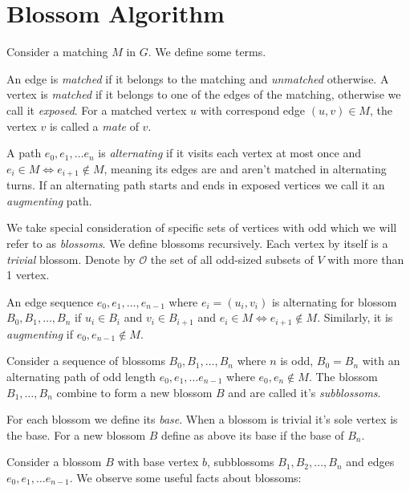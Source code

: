 \section{Blossom Algorithm}

Consider a matching $M$ in $G$. We define some terms.

An edge is \textit{matched} if it belongs to the matching and \textit{unmatched} otherwise. 
A vertex is \textit{matched} if it belongs to one of the edges of the matching, otherwise we call it \textit{exposed}. 
For a matched vertex $u$ with correspond edge $(u, v) \in M$, the vertex $v$ is called a \textit{mate} of $v$.

A path $e_0, e_1, \dots e_n$ is \textit{alternating} if it visits each vertex at most once and $e_i \in M \Leftrightarrow e_{i+1} \notin M$, meaning its edges are and aren't matched in alternating turns. 
If an alternating path starts and ends in exposed vertices we call it an \textit{augmenting} path.

We take special consideration of specific sets of vertices with odd which we will refer to as \textit{blossoms}. We define blossoms recursively. Each vertex by itself is a \textit{trivial} blossom. Denote by $\mathcal{O}$ the set of all odd-sized subsets of $V$ with more than 1 vertex.

An edge sequence $e_0, e_1, \dots, e_{n-1}$ where $e_i=(u_i, v_i)$ is alternating for blossom $B_0, B_1, \dots, B_n$ if $u_i \in B_i$ and $v_i \in B_{i+1}$ and $e_i \in M \Leftrightarrow e_{i+1} \notin M$. Similarly, it is \textit{augmenting} if $e_0, e_{n-1} \notin M$.

Consider a sequence of blossoms $B_0, B_1, \dots, B_n$ where $n$ is odd, $B_0 = B_n$ with an alternating path of odd length $e_0, e_1, \dots e_{n-1}$ where $e_0, e_n \notin M$. The blossom $B_1, \dots, B_n$ combine to form a new blossom $B$ and are called it's \textit{subblossoms}.

For each blossom we define its \textit{base}. When a blossom is trivial it's sole vertex is the base. For a new blossom $B$ define as above its base if the base of $B_n$.

Consider a blossom $B$ with base vertex $b$, subblossoms $B_1, B_2, \dots, B_n$ and edges $e_0, e_1, \dots e_{n-1}$. We observe some useful facts about blossoms:

